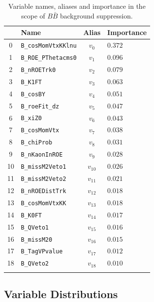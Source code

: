 \begin{longtable}{c|l|c|l}
& Name & Alias & Importance \\
\toprule 
0 &\texttt{\footnotesize B\_cosMomVtxKKlnu} & $v_{0}$ & $0.372$ \\ 
1 &\texttt{\footnotesize B\_ROE\_PThetacms0} & $v_{1}$ & $0.096$ \\ 
2 &\texttt{\footnotesize B\_nROETrk0} & $v_{2}$ & $0.079$ \\ 
3 &\texttt{\footnotesize B\_K1FT} & $v_{3}$ & $0.063$ \\ 
4 &\texttt{\footnotesize B\_cosBY} & $v_{4}$ & $0.051$ \\ 
5 &\texttt{\footnotesize B\_roeFit\_dz} & $v_{5}$ & $0.047$ \\ 
6 &\texttt{\footnotesize B\_xiZ0} & $v_{6}$ & $0.043$ \\ 
7 &\texttt{\footnotesize B\_cosMomVtx} & $v_{7}$ & $0.038$ \\ 
8 &\texttt{\footnotesize B\_chiProb} & $v_{8}$ & $0.031$ \\ 
9 &\texttt{\footnotesize B\_nKaonInROE} & $v_{9}$ & $0.028$ \\ 
10 &\texttt{\footnotesize B\_missM2Veto1} & $v_{10}$ & $0.026$ \\ 
11 &\texttt{\footnotesize B\_missM2Veto2} & $v_{11}$ & $0.021$ \\ 
12 &\texttt{\footnotesize B\_nROEDistTrk} & $v_{12}$ & $0.018$ \\ 
13 &\texttt{\footnotesize B\_cosMomVtxKK} & $v_{13}$ & $0.018$ \\ 
14 &\texttt{\footnotesize B\_K0FT} & $v_{14}$ & $0.017$ \\ 
15 &\texttt{\footnotesize B\_QVeto1} & $v_{15}$ & $0.016$ \\ 
16 &\texttt{\footnotesize B\_missM20} & $v_{16}$ & $0.015$ \\ 
17 &\texttt{\footnotesize B\_TagVPvalue} & $v_{17}$ & $0.012$ \\ 
18 &\texttt{\footnotesize B\_QVeto2} & $v_{18}$ & $0.010$ \\ 
\bottomrule
\captionsetup{width=0.8\linewidth}
\caption{Variable names, aliases and importance in the scope of $B\bar B$ background suppression.}
\end{longtable}

\subsection{Variable Distributions}

